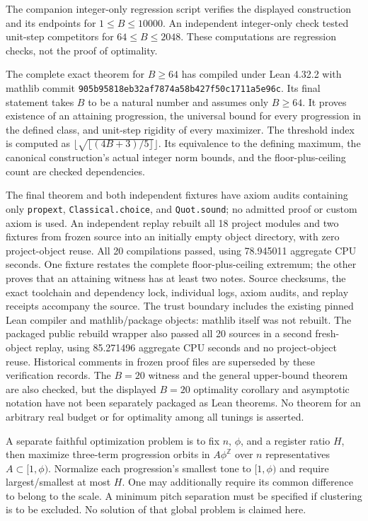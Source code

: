 \documentclass[11pt]{article}
\newcommand{\Z}{\mathbb Z}
\begin{document}
The companion integer-only regression script verifies the displayed construction and its endpoints for $1\le B\le10000$. An independent integer-only check tested unit-step competitors for $64\le B\le2048$. These computations are regression checks, not the proof of optimality.

The complete exact theorem for $B\ge64$ has compiled under Lean 4.32.2 with mathlib commit \texttt{905b95818eb32af7874a58b427f50c1711a5e96c}. Its final statement takes $B$ to be a natural number and assumes only $B\ge64$. It proves existence of an attaining progression, the universal bound for every progression in the defined class, and unit-step rigidity of every maximizer. The threshold index is computed as $\lfloor\sqrt{\lfloor(4B+3)/5\rfloor}\rfloor$. Its equivalence to the defining maximum, the canonical construction's actual integer norm bounds, and the floor-plus-ceiling count are checked dependencies.

The final theorem and both independent fixtures have axiom audits containing only \texttt{propext}, \texttt{Classical.choice}, and \texttt{Quot.sound}; no admitted proof or custom axiom is used. An independent replay rebuilt all 18 project modules and two fixtures from frozen source into an initially empty object directory, with zero project-object reuse. All 20 compilations passed, using 78.945011 aggregate CPU seconds. One fixture restates the complete floor-plus-ceiling extremum; the other proves that an attaining witness has at least two notes. Source checksums, the exact toolchain and dependency lock, individual logs, axiom audits, and replay receipts accompany the source. The trust boundary includes the existing pinned Lean compiler and mathlib/package objects: mathlib itself was not rebuilt. The packaged public rebuild wrapper also passed all 20 sources in a second fresh-object replay, using 85.271496 aggregate CPU seconds and no project-object reuse. Historical comments in frozen proof files are superseded by these verification records. The $B=20$ witness and the general upper-bound theorem are also checked, but the displayed $B=20$ optimality corollary and asymptotic notation have not been separately packaged as Lean theorems. No theorem for an arbitrary real budget or for optimality among all tunings is asserted.

A separate faithful optimization problem is to fix $n$, $\phi$, and a register ratio $H$, then maximize three-term progression orbits in $A\phi^{\Z}$ over $n$ representatives $A\subset[1,\phi)$. Normalize each progression's smallest tone to $[1,\phi)$ and require largest/smallest at most $H$. One may additionally require its common difference to belong to the scale. A minimum pitch separation must be specified if clustering is to be excluded. No solution of that global problem is claimed here.
\end{document}
